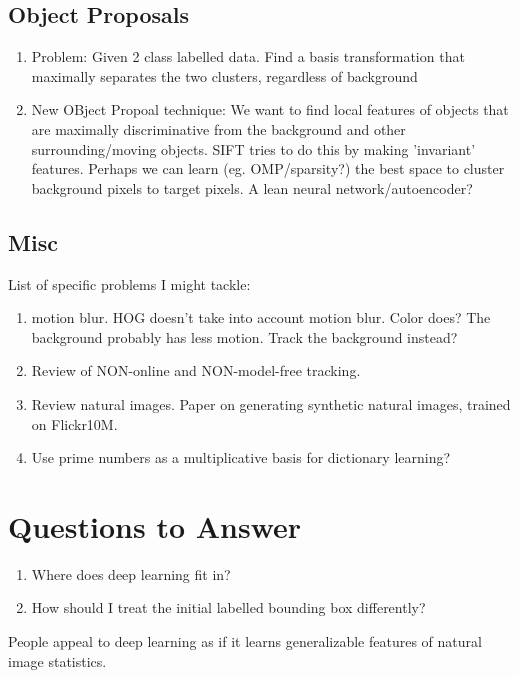 \subsection{Object Proposals}
\begin{enumerate}
\item Problem: Given 2 class labelled data. Find a basis transformation that maximally separates the two clusters, regardless of background
\item New OBject Propoal technique: We want to find local features of objects that are maximally discriminative from the background and other surrounding/moving objects. SIFT tries to do this by making 'invariant' features. Perhaps we can learn (eg. OMP/sparsity?) the best space to cluster background pixels to target pixels. A lean neural network/autoencoder?
\end{enumerate}


\subsection{Misc}
List of specific problems I might tackle:
\begin{enumerate}
\item motion blur. HOG doesn't take into account motion blur. Color does? The background probably has less motion. Track the background instead?
\item Review of NON-online and NON-model-free tracking.
\item Review natural images. Paper on generating synthetic natural images, trained on Flickr10M.
\item Use prime numbers as a multiplicative basis for dictionary learning?
\end{enumerate}

\section{Questions to Answer}
\begin{enumerate}
\item Where does deep learning fit in?
\item How should I treat the initial labelled bounding box differently?
\end{enumerate}

People appeal to deep learning as if it learns generalizable features of natural image statistics.

